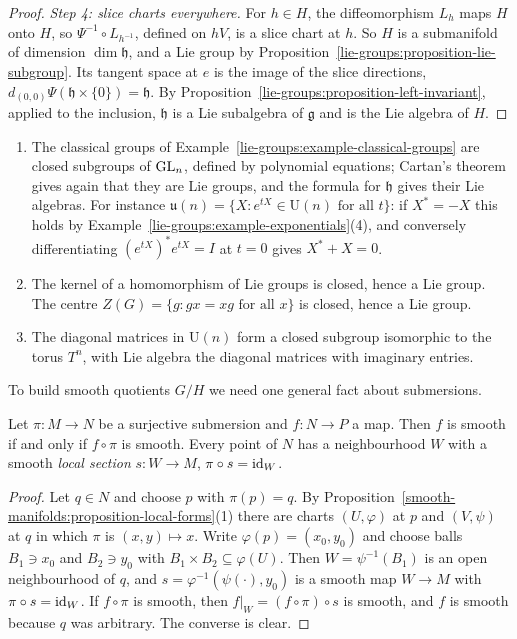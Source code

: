 \begin{proof}
\emph{Step 4: slice charts everywhere.} For $h \in H$, the diffeomorphism $L_h$ maps $H$ onto $H$, so $\Psi^{-1} \circ L_{h^{-1}}$, defined on $hV$, is a slice
chart at $h$. So $H$ is a submanifold of dimension $\dim\mathfrak{h}$, and a Lie group by Proposition~\ref{lie-groups:proposition-lie-subgroup}. Its tangent
space at $e$ is the image of the slice directions, $d_{(0,0)}\Psi(\mathfrak{h} \times \{0\}) = \mathfrak{h}$. By
Proposition~\ref{lie-groups:proposition-left-invariant}, applied to the inclusion, $\mathfrak{h}$ is a Lie subalgebra of $\mathfrak{g}$ and is the Lie algebra
of $H$.
\end{proof}

\begin{example}\label{lie-groups:example-closed-subgroups}
\begin{enumerate}
\item The classical groups of Example~\ref{lie-groups:example-classical-groups} are closed subgroups of $\mathrm{GL}_n$, defined by polynomial equations; Cartan's
theorem gives again that they are Lie groups, and the formula for $\mathfrak{h}$ gives their Lie algebras. For instance
$\mathfrak{u}(n) = \{X : e^{tX} \in \mathrm{U}(n) \text{ for all } t\}$: if $X^* = -X$ this holds by Example~\ref{lie-groups:example-exponentials}(4), and
conversely differentiating $(e^{tX})^*e^{tX} = I$ at $t = 0$ gives $X^* + X = 0$.
\item The kernel of a homomorphism of Lie groups is closed, hence a Lie group. The centre $Z(G) = \{g : gx = xg \text{ for all } x\}$ is closed, hence a
Lie group.
\item The diagonal matrices in $\mathrm{U}(n)$ form a closed subgroup isomorphic to the torus $T^n$, with Lie algebra the diagonal matrices with imaginary
entries.
\end{enumerate}
\end{example}

To build smooth quotients $G/H$ we need one general fact about submersions.

\begin{lemma}\label{lie-groups:lemma-submersion-descends}
Let $\pi \colon M \to N$ be a surjective submersion and $f \colon N \to P$ a map. Then $f$ is smooth if and only if $f \circ \pi$ is smooth. Every point of $N$
has a neighbourhood $W$ with a smooth \emph{local section} $s \colon W \to M$, $\pi \circ s = \mathrm{id}_W$.
\end{lemma}

\begin{proof}
Let $q \in N$ and choose $p$ with $\pi(p) = q$. By Proposition~\ref{smooth-manifolds:proposition-local-forms}(1) there are charts $(U, \varphi)$ at $p$ and
$(V, \psi)$ at $q$ in which $\pi$ is $(x, y) \mapsto x$. Write $\varphi(p) = (x_0, y_0)$ and choose balls $B_1 \ni x_0$ and $B_2 \ni y_0$ with
$B_1 \times B_2 \subseteq \varphi(U)$. Then $W = \psi^{-1}(B_1)$ is an open neighbourhood of $q$, and $s = \varphi^{-1}(\psi(\cdot), y_0)$ is a smooth map
$W \to M$ with $\pi \circ s = \mathrm{id}_W$. If $f \circ \pi$ is smooth, then $f|_W = (f \circ \pi) \circ s$ is smooth, and $f$ is smooth because $q$ was arbitrary. The
converse is clear.
\end{proof}

